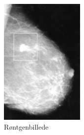 \begin{figure}[H]
  \centering
  \begin{minipage}{0.4\textwidth}
    \includegraphics[width=\textwidth]{figurer/r/rontgen}
    \caption{Røntgenbillede \cite{Mammografi}}
    \label{rontgen}
  \end{minipage}
  \hfill
  \begin{minipage}{0.535\textwidth}

\end{minipage}
\end{figure}
